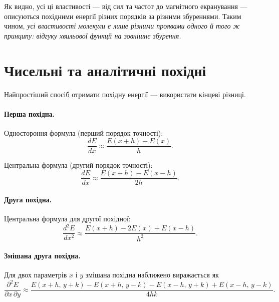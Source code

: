 Як видно, усі ці властивості --- від сил та частот до магнітного екранування ---
описуються похідними енергії різних порядків за різними збуреннями.
Таким чином, \emph{усі властивості молекули є лише різними проявами одного й того ж принципу: відгуку хвильової функції на зовнішнє збурення.}

\section{Чисельні та  аналітичні похідні}

Найпростіший спосіб отримати похідну енергії --- використати кінцеві різниці.

\paragraph{Перша похідна.}

Одностороння формула (перший порядок точності):
\begin{equation}
	\frac{dE}{dx}
	\approx
	\frac{E(x+h)-E(x)}{h}.
	\label{eq:finite_diff_forward}
\end{equation}

Центральна формула (другий порядок точності):
\begin{equation}
	\frac{dE}{dx}
	\approx
	\frac{E(x+h)-E(x-h)}{2h}.
	\label{eq:finite_diff_central_1st}
\end{equation}

\paragraph{Друга похідна.}

Центральна формула для другої похідної:
\begin{equation}
	\frac{d^2E}{dx^2}
	\approx
	\frac{E(x+h)-2E(x)+E(x-h)}{h^2}.
	\label{eq:finite_diff_2nd}
\end{equation}

\paragraph{Змішана друга похідна.}

Для двох параметрів $x$ і $y$ змішана похідна наближено виражається як
\begin{equation}
	\frac{\partial^2 E}{\partial x\,\partial y}
	\approx
	\frac{
		E(x+h,\,y+k)
		-
		E(x+h,\,y-k)
		-
		E(x-h,\,y+k)
		+
		E(x-h,\,y-k)
	}{4hk}.
	\label{eq:finite_diff_mixed}
\end{equation}

